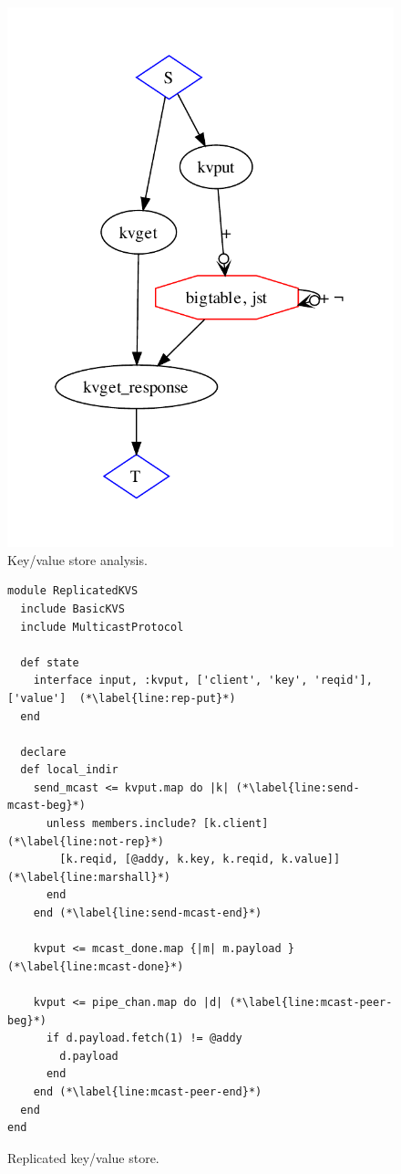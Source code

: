 \begin{figure}[t]
\centering
\includegraphics[width=0.5\linewidth]{fig/basickvs.pdf}
\vspace{-10pt}
\caption{Key/value store analysis.}
\label{fig:pdg-kvs-analysis}
\vspace{-2pt}
\end{figure}


\begin{figure}[t]
\begin{scriptsize}
\begin{lstlisting}
module ReplicatedKVS
  include BasicKVS
  include MulticastProtocol

  def state
    interface input, :kvput, ['client', 'key', 'reqid'], ['value']  (*\label{line:rep-put}*)
  end

  declare
  def local_indir
    send_mcast <= kvput.map do |k| (*\label{line:send-mcast-beg}*)
      unless members.include? [k.client]  (*\label{line:not-rep}*)
        [k.reqid, [@addy, k.key, k.reqid, k.value]]   (*\label{line:marshall}*)            
      end
    end (*\label{line:send-mcast-end}*)
    
    kvput <= mcast_done.map {|m| m.payload }  (*\label{line:mcast-done}*)

    kvput <= pipe_chan.map do |d| (*\label{line:mcast-peer-beg}*)
      if d.payload.fetch(1) != @addy
        d.payload
      end
    end (*\label{line:mcast-peer-end}*)
  end
end

\end{lstlisting}
\vspace{-10pt}
\caption{Replicated key/value store.}
\label{fig:kvs-repl}
\end{scriptsize}
\vspace{-2pt}
\end{figure}